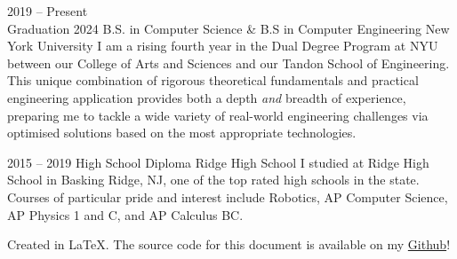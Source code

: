\documentclass[9pt]{developercv} %
\begin{document}


\begin{entrylist}
	\entry
	{
		2019 -- Present
		\\
		\footnotesize{Graduation 2024}
	}
	{B.S. in Computer Science \& B.S in Computer Engineering}
	{New York University}
	{
		I am a rising fourth year in the Dual Degree Program at NYU between our College of Arts and Sciences and our Tandon School of Engineering.
		This unique combination of rigorous theoretical fundamentals and practical engineering application provides both a depth \textit{and} breadth of experience, preparing me to tackle a wide variety of real-world engineering challenges via optimised solutions based on the most appropriate technologies.
	}

	\entry
	{2015 -- 2019}
	{High School Diploma}
	{Ridge High School}
	{
	  I studied at Ridge High School in Basking Ridge, NJ, one of the top rated high schools in the state. Courses of particular pride and interest include Robotics, AP Computer Science, AP Physics 1 and C, and AP Calculus BC.
	}
\end{entrylist}


\vspace{30pt}
Created in \LaTeX.
The source code for this document is available on my \href{https://github.com/Cosmic-Goat/Resume}{Github}!
\end{document}
